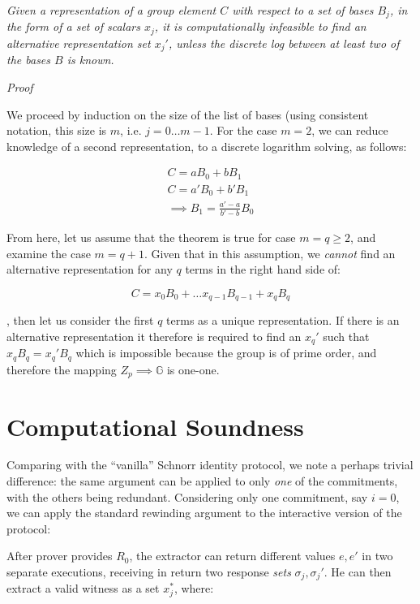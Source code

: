\documentclass[10pt,a4paper]{article}
\begin{document}
\emph{Given a representation of a group element $C$ with respect to a set of bases $B_j$, in the form of a set of scalars ${x_j}$, it is computationally infeasible to find an alternative representation set ${x_{j}'}$, unless the discrete log between at least two of the bases $B$ is known.}

\vspace{5 pt}

\emph{Proof}

\vspace{5 pt}

We proceed by induction on the size of the list of bases (using consistent notation, this size is $m$, i.e. $j = 0 \ldots m-1$. For the case $m=2$, we can reduce knowledge of a second representation, to a discrete logarithm solving, as follows:

\begin{align*}
C = aB_0 + bB_1 \\
C = a'B_0 + b'B_1 \\
\implies
B_1 = \frac{a'-a}{b'-b} B_0
\end{align*}

From here, let us assume that the theorem is true for case $m=q \ge 2$, and examine the case $m=q+1$. Given that in this assumption, we \emph{cannot} find an alternative representation for any $q$ terms in the right hand side of:

$$ C = x_0 B_0 + \ldots x_{q-1} B_{q-1} + x_q B_q $$

, then let us consider the first $q$ terms as a unique representation. If there is an alternative representation it therefore is required to find an $x_{q}'$ such that $x_q B_q = x_{q}' B_q$ which is impossible because the group is of prime order, and therefore the mapping $Z_{p} \implies \mathbb{G}$ is one-one.

\section{Computational Soundness}

Comparing with the ``vanilla'' Schnorr identity protocol, we note a perhaps trivial difference: the same argument can be applied to only \emph{one} of the commitments, with the others being redundant. Considering only one commitment, say $i=0$, we can apply the standard rewinding argument to the interactive version of the protocol:

After prover provides $R_0$, the extractor can return different values $e, e'$ in two separate executions, receiving in return two response \emph{sets} $\sigma_j, \sigma_{j}'$. He can then extract a valid witness as a set ${x_{j}^*}$, where:
\end{document}
